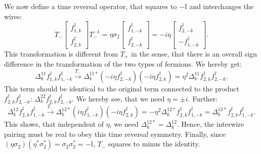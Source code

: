 We now define a time reversal operator, that squares to $-\mathbb{I}$ and interchanges the wires:
\begin{equation}
T_-\begin{bmatrix} f^\dagger_{1,k} \\ f^\dagger_{2,k} \end{bmatrix} T_-^{-1} = \eta\sigma_2 \begin{bmatrix} f^\dagger_{1,-k} \\ f^\dagger_{2,-k} \end{bmatrix} = -i\eta\begin{bmatrix} f^\dagger_{2,-k} \\ - f^\dagger_{1,-k} \end{bmatrix}.\nonumber
\end{equation} 
This transformation is different from $T_+$ in the sense, that there is an overall sign difference in the transformation of the two types of fermions.  
We hereby get:
\begin{equation}
\Delta^{11}_k f^\dagger_{1,k}f^\dagger_{1,-k} \overset{T_-}{\to} \Delta^{11*}_k \left(-i\eta f^\dagger_{2,-k}\right)\left(-i\eta f^\dagger_{2,k}\right) = \eta^2\Delta^{11}_k f^\dagger_{2,k}f^\dagger_{2,-k}. \nonumber
\end{equation}
This term should be identical to the original term connected to the product $f^\dagger_{2,k}f^\dagger_{2,-k}$: $\Delta^{22}_k f^\dagger_{2,k}f^\dagger_{2,-k}$. We hereby see, that we need $\eta = \pm i$. Further:
\begin{equation}
\Delta^{12}_k f^\dagger_{2,k}f^\dagger_{1,-k} \overset{T_-}{\to} \Delta^{12*}_k \left(i\eta f^\dagger_{1,-k}\right)\left(-i\eta f^\dagger_{2,k}\right) = -\eta^2 \Delta^{12*}_k f^\dagger_{2,k}f^\dagger_{1,-k} = \Delta^{12*}_k f^\dagger_{2,k}f^\dagger_{1,-k}. \nonumber
\end{equation}
This shows, that independent of $\eta$, we need $\Delta^{12*}_k = \Delta^{12}_k$. Hence, the interwire pairing must be real to obey this time reversal symmetry. Finally, since $(\eta \sigma_2)(\eta^* \sigma_2^*) = \sigma_2\sigma_2^* = -\mathbb{I}$, $T_-$ squares to minus the identity. 

